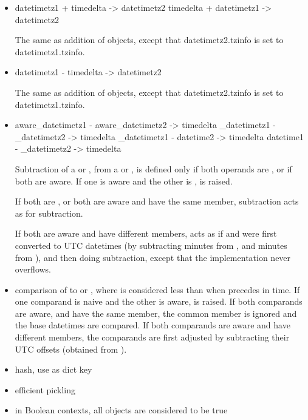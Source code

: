 \begin{itemize}
  \item
    datetimetz1 + timedelta -> datetimetz2
    timedelta + datetimetz1 -> datetimetz2

    The same as addition of  objects, except that
    datetimetz2.tzinfo is set to datetimetz1.tzinfo.

  \item
    datetimetz1 - timedelta -> datetimetz2

    The same as addition of  objects, except that
    datetimetz2.tzinfo is set to datetimetz1.tzinfo.

  \item
    aware_datetimetz1 - aware_datetimetz2 -> timedelta
    \naive\_datetimetz1 - \naive\_datetimetz2 -> timedelta
    \naive\_datetimetz1 - datetime2 -> timedelta
    datetime1 - \naive\_datetimetz2 -> timedelta

    Subtraction of a  or , from a
     or , is defined only if both
    operands are \naive, or if both are aware.  If one is aware and the
    other is \naive,  is raised.

    If both are \naive, or both are aware and have the same 
    member, subtraction acts as for  subtraction.

    If both are aware and have different  members,
     acts as if  and  were first converted to UTC
    datetimes (by subtracting  minutes from ,
    and  minutes from ), and then doing
     subtraction, except that the implementation never
    overflows.

  \item
    comparison of  to  or
    , where  is considered less than 
    when  precedes  in time.  If one comparand is naive and
    the other is aware,  is raised.  If both
    comparands are aware, and have the same  member,
    the common  member is ignored and the base datetimes
    are compared.  If both comparands are aware and have different
     members, the comparands are first adjusted by
    subtracting their UTC offsets (obtained from ).

  \item
    hash, use as dict key

  \item
    efficient pickling

  \item
    in Boolean contexts, all  objects are considered to be
    true
\end{itemize}

